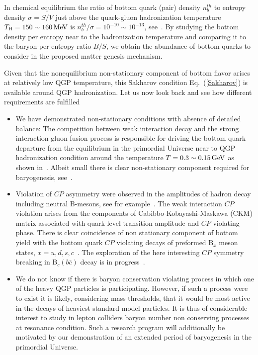 In chemical equilibrium the ratio of bottom quark (pair) density $n_b^{th}$ to entropy density $\sigma=S/V$ just above the quark-gluon hadronization temperature $T_\mathrm{H}=150\sim160\text{\,MeV}$ is $n_b^{th}/\sigma=10^{-10}\sim 10^{-13}$, see~. By studying the bottom density per entropy near to the hadronization temperature and comparing it to the baryon-per-entropy ratio $B/S$, we obtain the abundance of bottom quarks to consider in the proposed matter genesis mechanism.

Given that the nonequilibrium non-stationary component of bottom flavor arises at relatively low QGP temperature, {\color{blue}this Sakharov condition Eq.~(\ref{Sakharov}) is available around QGP hadronization.} Let us now look back and see how different requirements are fulfilled
\begin{itemize}
\item
 We have demonstrated non-stationary conditions with absence of detailed balance: The competition between weak interaction decay and the strong interaction gluon fusion process is responsible for driving the bottom quark departure from the equilibrium in the primordial Universe near to QGP hadronization condition around the temperature $T=0.3\sim0.15\text{\,GeV}$ as shown in~. Albeit small there is clear non-stationary component required for baryogenesis, see~.
\item Violation of $CP$ asymmetry were observed in the amplitudes of hadron decay including neutral B-mesons, see for example~\cite{LHCb:2019jta,LHCb:2020vut}. The weak interaction $CP$ violation arises from the components of Cabibbo-Kobayashi-Maskawa (CKM) matrix associated with quark-level transition amplitude and $CP$-violating phase. There is clear coincidence of non stationary component of bottom yield with the bottom quark $CP$ violating decays of preformed $\mathrm{B}_x$ meson states, $x=u,d,s,c$~\cite{Karsch:1987pv,Brambilla:2010vq,Aarts:2011sm,Brambilla:2017zei,Bazavov:2018wmo,Offler:2019eij}. The exploration of the here interesting $CP$ symmetry breaking in B$_c(b\bar c)$ decay is in progress~\cite{ParticleDataGroup:2022pth,Tully:2019ltb,HFLAV:2019otj}.
\item
We do not know if there is baryon conservation violating process in which one of the heavy QGP particles is participating. However, if such a process were to exist it is likely, considering mass thresholds, that it would be most active in the decays of heaviest standard model particles. It is thus of considerable interest to study in lepton colliders baryon number non conserving processes at resonance condition. Such a research program will additionally be motivated by our demonstration of an extended period of baryogenesis in the primordial Universe. 
\end{itemize}


